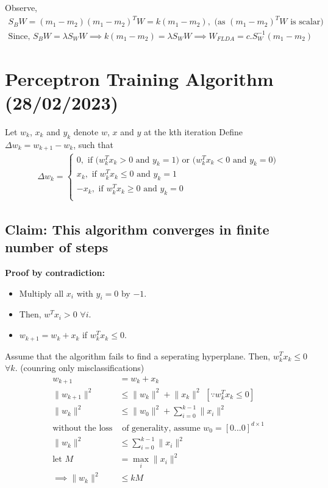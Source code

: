 \documentclass[11pt]{article}
\begin{document}
Observe,
\begin{align*}
S_B W = (m_1 - m_2)(m_1 - m_2)^T W = k(m_1 - m_2), \text{ (as $(m_1 - m_2)^T W$ is scalar)} \\
\text{Since, } S_B W = \lambda S_W W \implies k(m_1 - m_2) = \lambda S_W W \implies W_{FLDA} = c . S_W^{-1}(m_1 - m_2)
\end{align*}

\section{Perceptron Training Algorithm (28/02/2023)}
\label{sec:orgf216477}

Let \(w_k\), \(x_k\) and \(y_k\) denote \(w\), \(x\) and \(y\) at the kth iteration
Define \(\Delta w_k = w_{k+1} - w_k\), such that
\begin{align*}
\Delta w_k = \begin{cases}
0, \text{ if ($w^T_k x_k > 0$ and $y_k = 1$) or ($w^T_k x_k < 0$ and $y_k = 0$)} \\
x_k, \text{ if $w^T_k x_k \leq 0$ and $y_k = 1$} \\
-x_k, \text{ if $w^T_k x_k \geq 0$ and $y_k = 0$} \\
\end{cases}
\end{align*}

\subsection{Claim: This algorithm converges in finite number of steps}
\label{sec:orgff112af}

\textbf{Proof by contradiction:}
\begin{itemize}
\item Multiply all \(x_i\) with \(y_i = 0\) by \(-1\).
\item Then, \(w^T x_i > 0\) \(\forall i\).
\item \(w_{k+1} = w_k + x_k\) if \(w_k^T x_k \leq 0\).
\end{itemize}

Assume that the algorithm fails to find a seperating hyperplane. Then, \(w_k^T x_k \leq 0\) \(\forall k\). (counring only misclassifications)
\begin{align*}
w_{k+1} &= w_k + x_k \\
\lVert w_{k+1} \rVert^2 &\leq \lVert w_k \rVert^2 + \lVert x_k \rVert^2 \,\, [\because w^T_k x_k \leq 0] \\
\lVert w_k \rVert^2 &\leq \lVert w_0 \rVert^2 + \sum_{i=0}^{k-1} \lVert x_i \rVert^2 \\
\text{without the loss} &\text{ of generality, assume $w_0 = [0 ... 0]^{d \times 1}$} \\
\lVert w_k \rVert^2 &\leq \sum_{i=0}^{k-1} \lVert x_i \rVert^2 \\
\text{let } M &= \max_i \lVert x_i \rVert^2 \\
\implies \lVert w_k \rVert^2 &\leq k M
\end{align*}
\end{document}
